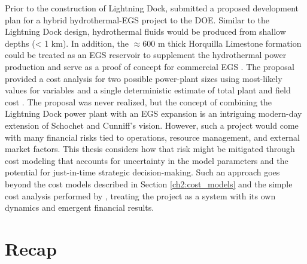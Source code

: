Prior to the construction of Lightning Dock, \citet{schochet_development_2001} submitted a proposed development plan for a hybrid hydrothermal-EGS project to the DOE. Similar to the Lightning Dock design, hydrothermal fluids would be produced from shallow depths (< 1 km). In addition, the $\approx600$ m thick Horquilla Limestone formation could be treated as an EGS reservoir to supplement the hydrothermal power production and serve as a proof of concept for commercial EGS \citep{schochet_development_2001}. The proposal provided a cost analysis for two possible power-plant sizes using most-likely values for variables and a single deterministic estimate of total plant and field cost \citep[Table 3,][]{schochet_development_2001}. The proposal was never realized, but the concept of combining the Lightning Dock power plant with an EGS expansion is an intriguing modern-day extension of Schochet and Cunniff’s vision. However, such a project would come with many financial risks tied to operations, resource management, and external market factors. This thesis considers how that risk might be mitigated through cost modeling that accounts for uncertainty in the model parameters and the potential for just-in-time strategic decision-making. Such an approach goes beyond the cost models described in Section \ref{ch2:cost_models} and the simple cost analysis performed by \citet{schochet_development_2001}, treating the project as a system with its own dynamics and emergent financial results.

\section{Recap}\label{ch2:recap}

